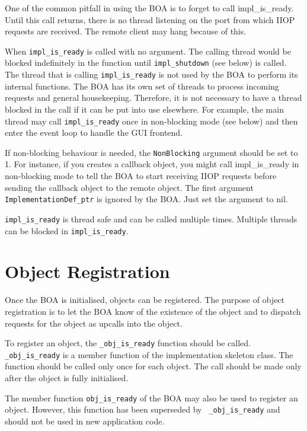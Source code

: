 \documentclass[11pt,twoside,onecolumn]{book}
\begin{document}
One of the common pitfall in using the BOA is to forget to call
impl\_is\_ready. Until this call returns, there is no thread listening on
the port from which IIOP requests are received. The remote client may hang
because of this.

When {\tt impl\_is\_ready} is called with no argument. The calling thread
would be blocked indefinitely in the function until {\tt impl\_shutdown}
(see below) is called. The thread that is calling {\tt impl\_is\_ready}
is not used by the BOA to perform its internal functions. The BOA has its
own set of threads to process incoming requests and general
housekeeping. Therefore, it is not necessary to have a thread blocked in
the call if it can be put into use elsewhere. For example, the main thread
may call {\tt impl\_is\_ready} once in non-blocking mode (see below) and
then enter the event loop to handle the GUI frontend.

If non-blocking behaviour is needed, the {\tt NonBlocking} argument should be
set to 1. For instance, if you creates a callback object, you might call
impl\_is\_ready in non-blocking mode to tell the BOA to start receiving
IIOP requests before sending the callback object to the remote object. The
first argument {\tt ImplementationDef\_ptr} is ignored by the BOA. Just set
the argument to nil.

{\tt impl\_is\_ready} is thread safe and can be called multiple
times. Multiple threads can be blocked in {\tt impl\_is\_ready}.

\section{Object Registration}

Once the BOA is initialised, objects can be registered. The
purpose of object registration is to let the BOA know of the existence of
the object and to dispatch requests for the object as upcalls into the
object. 

To register an object, the {\tt \_obj\_is\_ready} function should be
called. {\tt \_obj\_is\_ready} is a member function of the implementation
skeleton class. The function should be called only once for each object.
The call should be made only after the object is fully initialised.

The member function {\tt obj\_is\_ready} of the BOA may also be used to
register an object. However, this function has been superseded by {\tt
\_obj\_is\_ready} and should not be used in new application code.
\end{document}
